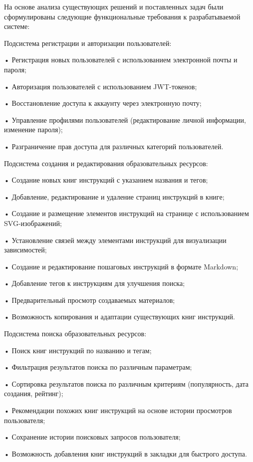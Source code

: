 {\gostFont

  \par \redline На основе анализа существующих решений и поставленных задач были сформулированы следующие функциональные требования к разрабатываемой системе:

  \par \redline Подсистема регистрации и авторизации пользователей:

  \par \redline • Регистрация новых пользователей с использованием электронной почты и пароля;
  \par \redline • Авторизация пользователей с использованием JWT-токенов;
  \par \redline • Восстановление доступа к аккаунту через электронную почту;
  \par \redline • Управление профилями пользователей (редактирование личной информации, изменение пароля);
  \par \redline • Разграничение прав доступа для различных категорий пользователей.

  \par \redline Подсистема создания и редактирования образовательных ресурсов:

  \par \redline • Создание новых книг инструкций с указанием названия и тегов;
  \par \redline • Добавление, редактирование и удаление страниц инструкций в книге;
  \par \redline • Создание и размещение элементов инструкций на странице с использованием SVG-изображений;
  \par \redline • Установление связей между элементами инструкций для визуализации зависимостей;
  \par \redline • Создание и редактирование пошаговых инструкций в формате Markdown;
  \par \redline • Добавление тегов к инструкциям для улучшения поиска;
  \par \redline • Предварительный просмотр создаваемых материалов;
  \par \redline • Возможность копирования и адаптации существующих книг инструкций.

  \par \redline Подсистема поиска образовательных ресурсов:

  \par \redline • Поиск книг инструкций по названию и тегам;
  \par \redline • Фильтрация результатов поиска по различным параметрам;
  \par \redline • Сортировка результатов поиска по различным критериям (популярность, дата создания, рейтинг);
  \par \redline • Рекомендации похожих книг инструкций на основе истории просмотров пользователя;
  \par \redline • Сохранение истории поисковых запросов пользователя;
  \par \redline • Возможность добавления книг инструкций в закладки для быстрого доступа.

}
